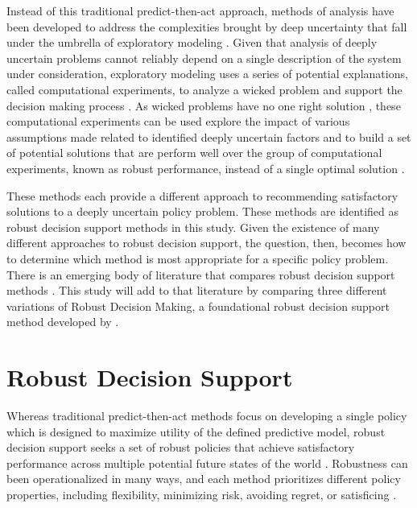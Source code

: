 Instead of this traditional predict-then-act approach, methods of analysis have been developed to address the complexities brought by deep uncertainty that fall under the umbrella of exploratory modeling \citep{Bankes1993}. Given that analysis of deeply uncertain problems cannot reliably depend on a single description of the system under consideration, exploratory modeling uses a series of potential explanations, called computational experiments, to analyze a wicked problem and support the decision making process \citep{Bankes2002}. As wicked problems have no one right solution \citep{Rittel1973}, these computational experiments can be used explore the impact of various assumptions made related to identified deeply uncertain factors and to build a set of potential solutions that are perform well over the group of computational experiments, known as robust performance, instead of a single optimal solution \citep{Bankes2002, Kwakkel2016Compare}. 

These methods each provide a different approach to recommending satisfactory solutions to a deeply uncertain policy problem. These methods are identified as robust decision support methods in this study. Given the existence of many different approaches to robust decision support, the question, then, becomes how to determine which method is most appropriate for a specific policy problem. There is an emerging body of literature that compares robust decision support methods \citep{Hall2012, Gersonius2016, Kwakkel2016Compare, Matrosov2013a, Roach2015, Roach2016}. This study will add to that literature by comparing three different variations of Robust Decision Making, a foundational robust decision support method developed by \citet{Lempert2006}. 

\section{Robust Decision Support}
Whereas traditional predict-then-act methods focus on developing a single policy which is designed to maximize utility of the defined predictive model, robust decision support seeks a set of robust policies that achieve satisfactory performance across multiple potential future states of the world \citep{Herman2015, Popper2005, Walker2013}. Robustness can been operationalized in many ways, and each method prioritizes different policy properties, including flexibility, minimizing risk, avoiding regret, or satisficing \citep{McPhail2018}. 

